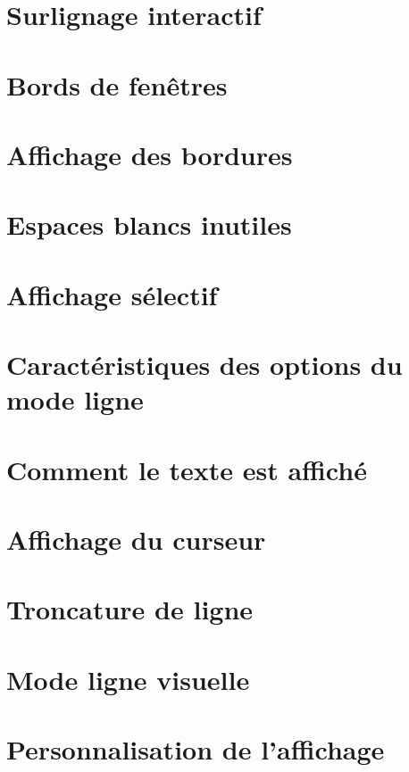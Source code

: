\section{Surlignage interactif}
\section{Bords de fenêtres}
\section{Affichage des bordures}
\section{Espaces blancs inutiles}
\section{Affichage sélectif}
\section{Caractéristiques des options du mode ligne}
\section{Comment le texte est affiché}
\section{Affichage du curseur}
\section{Troncature de ligne}
\section{Mode ligne visuelle}
\section{Personnalisation de l'affichage}